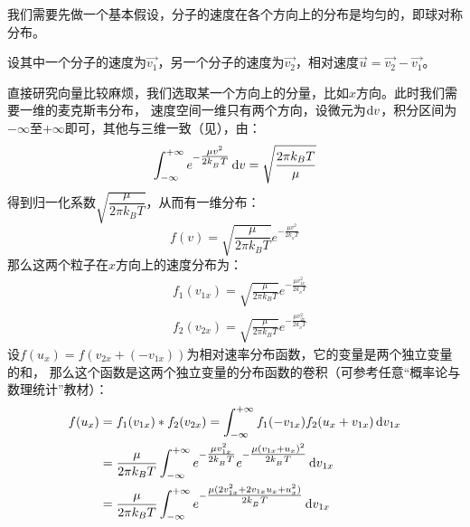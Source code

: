 \begin{prove}
    我们需要先做一个基本假设，分子的速度在各个方向上的分布是均匀的，即球对称分布。

    设其中一个分子的速度为$\vec{v_1}$，另一个分子的速度为$\vec{v_2}$，相对速度$\vec{u} = \vec{v_2} - \vec{v_1}$。

    直接研究向量比较麻烦，我们选取某一个方向上的分量，比如$x$方向。此时我们需要一维的麦克斯韦分布，
    速度空间一维只有两个方向，设微元为$\dif v$，积分区间为$-\infty$至$+\infty$即可，其他与三维一致（见），由：
    \begin{equation}
        \int_{-\infty}^{+\infty} e^{-\tfrac{\mu v^{2}}{2k_{_B}T}}\dif{v} = \sqrt{\frac{2\pi k_{B}T}{\mu}}
    \end{equation}
    得到归一化系数$\sqrt{\dfrac{\mu}{2\pi k_{B}T}}$，从而有一维分布：
    \begin{equation*}
        f(v) = \sqrt{\frac{\mu}{2\pi k_{B}T}}e^{-\tfrac{\mu v^{2}}{2k_{_B}T}}
    \end{equation*}
    那么这两个粒子在$x$方向上的速度分布为：
    \begin{equation*}
        \begin{aligned}
             & f_1(v_{1x}) = \sqrt{\frac{\mu}{2\pi k_{B}T}}e^{-\tfrac{\mu v_{1x}^{2}}{2k_{_B}T}} \\
             & f_2(v_{2x}) = \sqrt{\frac{\mu}{2\pi k_{B}T}}e^{-\tfrac{\mu v_{2x}^{2}}{2k_{_B}T}}
        \end{aligned}
    \end{equation*}
    设$f(u_x) = f(v_{2x} + (- v_{1x}))$为相对速率分布函数，它的变量是两个独立变量的和，
    那么这个函数是这两个独立变量的分布函数的卷积（可参考任意“概率论与数理统计”教材）：
    \begin{equation*}
        \begin{aligned}
            f(u_x) & = f_1(v_{1x}) \ast f_2(v_{2x}) = \int_{-\infty}^{+\infty} f_1(- v_{1x})f_2(u_x + v_{1x})\dif v_{1x}                                                \\
                   & =\frac{\mu}{2\pi k_{B}T} \int_{-\infty}^{+\infty} e^{-\tfrac{\mu v_{1x}^{2}}{2k_{_B}T}} e^{-\tfrac{\mu (v_{1x} + u_x)^{2}}{2k_{_B}T}} \dif v_{1x}  \\
                   & =\frac{\mu}{2\pi k_{B}T} \int_{-\infty}^{+\infty} e^{-\tfrac{\mu (2v_{1x}^{2}+ 2v_{1x}u_{x} + u_{x}^{2})}{2k_{_B}T}} \dif v_{1x}                   \\

\end{aligned}
\end{equation*}
\end{prove}
